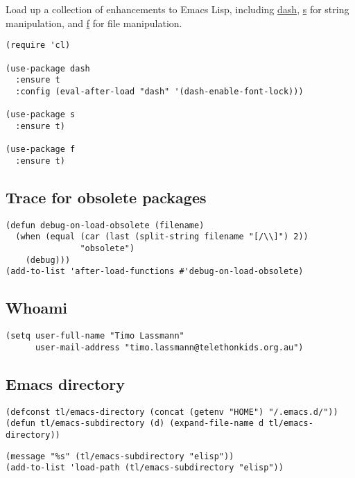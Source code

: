 \documentclass[12pt]{article}
\begin{document}
Load up a collection of enhancements to Emacs Lisp, including \href{https://github.com/magnars/dash.el}{dash},
\href{https://github.com/magnars/s.el}{s} for string manipulation, and \href{https://github.com/rejeep/f.el}{f} for file manipulation.

\begin{verbatim}
(require 'cl)

(use-package dash
  :ensure t
  :config (eval-after-load "dash" '(dash-enable-font-lock)))

(use-package s
  :ensure t)

(use-package f
  :ensure t)
\end{verbatim}

\subsection{Trace for obsolete packages}
\label{sec:orgb4f5e35}

\begin{verbatim}
(defun debug-on-load-obsolete (filename)
  (when (equal (car (last (split-string filename "[/\\]") 2))
               "obsolete")
    (debug)))
(add-to-list 'after-load-functions #'debug-on-load-obsolete)

\end{verbatim}
\subsection{Whoami}
\label{sec:org5c5cd99}

\begin{verbatim}
(setq user-full-name "Timo Lassmann"
      user-mail-address "timo.lassmann@telethonkids.org.au")
\end{verbatim}

\subsection{Emacs directory}
\label{sec:orgeb5a13f}

\begin{verbatim}
(defconst tl/emacs-directory (concat (getenv "HOME") "/.emacs.d/"))
(defun tl/emacs-subdirectory (d) (expand-file-name d tl/emacs-directory))
\end{verbatim}

\begin{verbatim}
(message "%s" (tl/emacs-subdirectory "elisp"))
(add-to-list 'load-path (tl/emacs-subdirectory "elisp"))
\end{verbatim}
\end{document}
